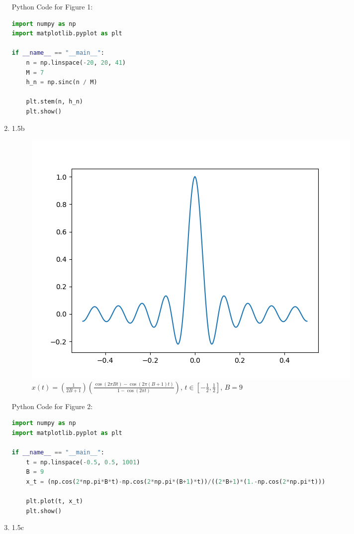 \documentclass[12pt]{article}
\begin{document}
\begin{enumerate}
\noindent Python Code for Figure 1:

\begin{lstlisting}[language=Python]
import numpy as np
import matplotlib.pyplot as plt

if __name__ == "__main__":
    n = np.linspace(-20, 20, 41)
    M = 7
    h_n = np.sinc(n / M)

    plt.stem(n, h_n)
    plt.show()
\end{lstlisting}
\newpage

\item[] 1.5b

\begin{figure}[h]
    \caption{
        $x(t)=(\frac{1}{2B+1})(\frac{\cos(2\pi Bt)-\cos(2\pi(B+1)t)}{1-\cos(2\pi t)})$, 
        $t\in[-\frac{1}{2}, \frac{1}{2}]$, $B=9$
        }
    \centering
    \includegraphics[scale=0.6]{1-5b.png}
\end{figure}

\noindent Python Code for Figure 2:

\begin{lstlisting}[language=Python]
import numpy as np
import matplotlib.pyplot as plt

if __name__ == "__main__":
    t = np.linspace(-0.5, 0.5, 1001)
    B = 9
    x_t = (np.cos(2*np.pi*B*t)-np.cos(2*np.pi*(B+1)*t))/((2*B+1)*(1.-np.cos(2*np.pi*t)))

    plt.plot(t, x_t)
    plt.show()
\end{lstlisting}
\newpage

\item[]  1.5c


\end{enumerate}
\end{document}
